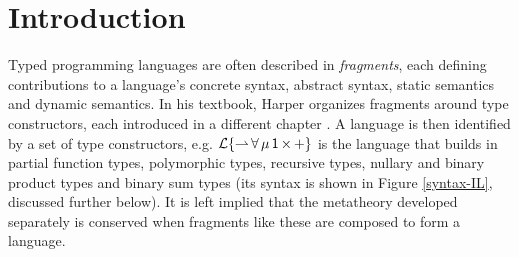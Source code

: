 \documentclass[9pt,preprint]{sigplanconf}
\begin{document}
\begin{abstract}
\end{abstract}

\section{Introduction}
Typed programming languages are often described in \emph{fragments}, each defining contributions to a language's concrete syntax, abstract syntax, static semantics and dynamic semantics. 
In his textbook, Harper organizes fragments around type constructors, each introduced in a different chapter \cite{pfpl}. A language is then identified by a set of type constructors, e.g. $\mathcal{L}\{{\rightharpoonup}\,{\forall}\,{\mu}\,{{\sf 1}}\,{\times}\,{+}\}$ is the language that builds in partial function types,  polymorphic types, recursive types, nullary and binary product types and binary sum types (its syntax is shown in Figure \ref{syntax-IL}, discussed further below).
It is left implied that the metatheory developed separately is conserved when fragments like these are composed to form a language.  
\end{document}
